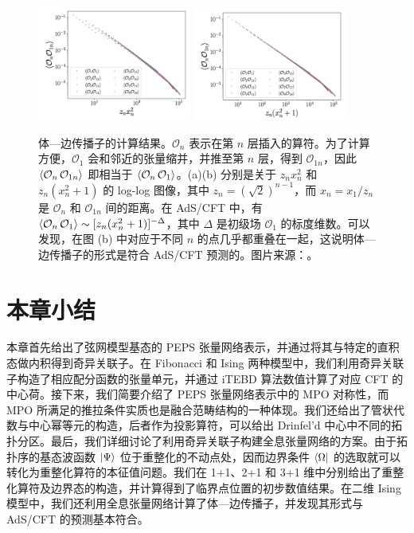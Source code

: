 \begin{figure}[htb]
  \centering
  \includegraphics[width=0.45\textwidth]{images/holographic/bulk-boundary-propagator-1.png}
  \includegraphics[width=0.45\textwidth]{images/holographic/bulk-boundary-propagator-2.png}
  \caption[体—边传播子的计算结果]{体—边传播子的计算结果。$\mathcal{O}_n$ 表示在第 $n$ 层插入的算符。为了计算方便，$\mathcal{O}_1$ 会和邻近的张量缩并，并推至第 $n$ 层，得到 $\mathcal{O}_{1n}$，因此 $\ev{\mathcal{O}_n\,\mathcal{O}_{1n}}$ 即相当于 $\ev{\mathcal{O}_n\,\mathcal{O}_1}$。(a)(b) 分别是关于 $z_n x_n^2$ 和 $z_n(x_n^2+1)$ 的 log-log 图像，其中 $z_n=(\sqrt{2})^{n-1}$，而 $x_n=x_1/z_n$ 是 $\mathcal{O}_n$ 和 $\mathcal{O}_{1n}$ 间的距离。在 AdS/CFT 中，有 $\ev{\mathcal{O}_n\,\mathcal{O}_1}\sim[z_n(x_n^2+1)]^{-\Delta}$，其中 $\Delta$ 是初级场 $\mathcal{O}_1$ 的标度维数。可以发现，在图 (b) 中对应于不同 $n$ 的点几乎都重叠在一起，这说明体—边传播子的形式是符合 AdS/CFT 预测的。图片来源：\parencite{chen2022exact}。}
  \label{fig:bulk-boundary-propagator}
\end{figure}

\section{本章小结}

本章首先给出了弦网模型基态的 PEPS 张量网络表示，并通过将其与特定的直积态做内积得到奇异关联子。在 Fibonacci 和 Ising 两种模型中，我们利用奇异关联子构造了相应配分函数的张量单元，并通过 iTEBD 算法数值计算了对应 CFT 的中心荷。接下来，我们简要介绍了 PEPS 张量网络表示中的 MPO 对称性，而 MPO 所满足的推拉条件实质也是融合范畴结构的一种体现。我们还给出了管状代数与中心幂等元的构造，后者作为投影算符，可以给出 Drinfel'd 中心中不同的拓扑分区。最后，我们详细讨论了利用奇异关联子构建全息张量网络的方案。由于拓扑序的基态波函数 $\ket{\Psi}$ 位于重整化的不动点处，因而边界条件 $\bra{\Omega}$ 的选取就可以转化为重整化算符的本征值问题。我们在 1+1、2+1 和 3+1 维中分别给出了重整化算符及边界态的构造，并计算得到了临界点位置的初步数值结果。在二维 Ising 模型中，我们还利用全息张量网络计算了体—边传播子，并发现其形式与 AdS/CFT 的预测基本符合。
